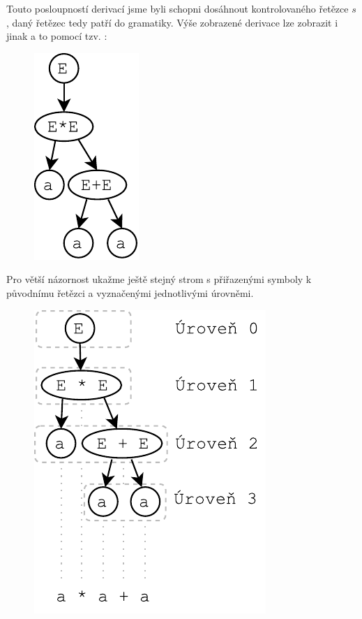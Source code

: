 \noindent
Touto posloupností derivací jsme byli schopni dosáhnout kontrolovaného řetězce $s$,
daný řetězec tedy patří do gramatiky. Výše zobrazené derivace lze zobrazit
i jinak a to pomocí tzv. :

\begin{figure}[H]
  \centering
  \includegraphics{fig/Derivations1.pdf}
\end{figure}

\noindent
Pro větší názornost ukažme ještě stejný strom s přiřazenými symboly k původnímu
řetězci a vyznačenými jednotlivými úrovněmi.

\begin{figure}[H]
  \centering
  \includegraphics{fig/Derivations2.pdf}
\end{figure}

